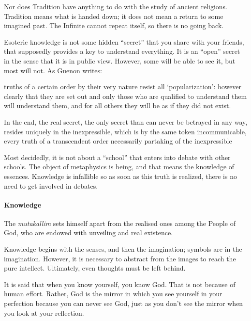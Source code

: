 Nor does Tradition have anything to do with the study of ancient religions. Tradition means what is handed down; it does not mean a return to some imagined past. The Infinite cannot repeat itself, so there is no going back.

Esoteric knowledge is not some hidden ``secret'' that you share with your friends, that supposedly provides a key to understand everything. It is an ``open'' secret in the sense that it is in public view. However, some will be able to see it, but most will not. As Guenon writes:

\begin{quotationx}
truths of a certain order by their very nature resist all `popularization': however clearly that they are set out and only those who are qualified to understand them will understand them, and for all others they will be as if they did not exist.

In the end, the real secret, the only secret than can never be betrayed in any way, resides uniquely in the inexpressible, which is by the same token incommunicable, every truth of a transcendent order necessarily partaking of the inexpressible
\end{quotationx}

Most decidedly, it is not about a ``school'' that enters into debate with other schools. The object of metaphysics is being, and that means the knowledge of essences. Knowledge is infallible so as soon as this truth is realized, there is no need to get involved in debates.

\paragraph{Knowledge}

\begin{quotex} 
The \emph{mutakallim} sets himself apart from the realised ones among the People of God, who are endowed with unveiling and real existence.
\end{quotex}

Knowledge begins with the senses, and then the imagination; symbols are in the imagination. However, it is necessary to abstract from the images to reach the pure intellect. Ultimately, even thoughts must be left behind.

It is said that when you know yourself, you know God. That is not because of human effort. Rather, God is the mirror in which you see yourself in your perfection because you can never see God, just as you don't see the mirror when you look at your reflection.

